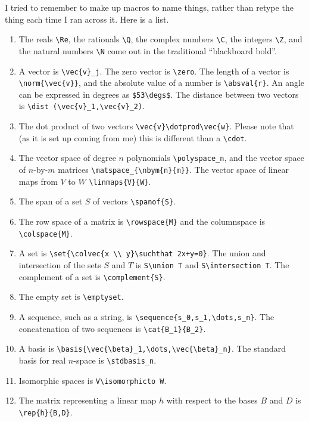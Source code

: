 \documentclass[titlepage]{article}
\begin{document}
\begin{description}
  I tried to remember to make up macros to name things, rather than retype the
  thing each time I ran across it.
  Here is a list.
  \begin{enumerate}
    \item The reals \verb|\Re|, the rationals \verb|\Q|,
      the complex numbers \verb|\C|, the integers \verb|\Z|,
      and the natural numbers \verb|\N| come out in the traditional
      ``blackboard bold''.
    \item A vector is \verb|\vec{v}_j|.
      The zero vector is \verb|\zero|.
      The length of a vector is \verb|\norm{\vec{v}}|, and the 
      absolute value of a number is \verb|\absval{r}|.
      An angle can be expressed in degrees as \verb!$53\degs$!.
      The distance between two vectors is \verb|\dist (\vec{v}_1,\vec{v}_2)|.
    \item The dot product of two vectors \verb|\vec{v}\dotprod\vec{w}|.
      Please note that (as it is set up coming from me) 
      this is different than a \verb!\cdot!.
    \item The vector space of degree $n$ polynomials \verb|\polyspace_n|,
      and the vector space of $n$-by-$m$ matrices 
      \verb|\matspace_{\nbym{n}{m}}|.
      The vector space of linear maps from $V$ to $W$
      \verb|\linmaps{V}{W}|. 
    \item The span of a set $S$ of vectors
      \verb|\spanof{S}|.
    \item The row space of a matrix is \verb!\rowspace{M}! and
      the columnspace is \verb!\colspace{M}!.
    \item A set is \verb!\set{\colvec{x \\ y}\suchthat 2x+y=0}!.
      The union and intersection of the sets $S$ and $T$ is
      \verb|S\union T| and \verb|S\intersection T|.
      The complement of a set is \verb!\complement{S}!.
    \item The empty set is \verb!\emptyset!.
    \item A sequence, such as a string, is \verb!\sequence{s_0,s_1,\dots,s_n}!.
      The concatenation of two sequences is \verb!\cat{B_1}{B_2}!.
    \item A basis is \verb!\basis{\vec{\beta}_1,\dots,\vec{\beta}_n}!.
      The standard basis for real $n$-space is
      \verb|\stdbasis_n|. 
    \item Isomorphic spaces is \verb!V\isomorphicto W!.
    \item The matrix representing a linear map $h$ with respect to 
      the bases $B$ and $D$ is \verb|\rep{h}{B,D}|.

\end{enumerate}
\end{description}
\end{document}
